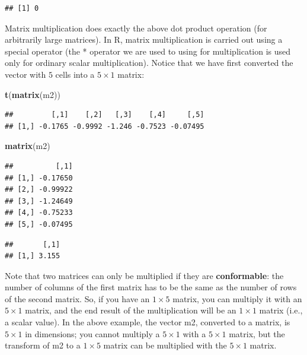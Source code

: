 \documentclass[12pt,]{krantz}
\newenvironment{Shaded}{\begin{snugshade}}{\end{snugshade}}
\newcommand{\KeywordTok}[1]{\textcolor[rgb]{0.13,0.29,0.53}{\textbf{#1}}}
\newcommand{\NormalTok}[1]{#1}
\newcommand{\OperatorTok}[1]{\textcolor[rgb]{0.81,0.36,0.00}{\textbf{#1}}}
\begin{document}
\begin{verbatim}
## [1] 0
\end{verbatim}

Matrix multiplication does exactly the above dot product operation (for arbitrarily large matrices). In R, matrix multiplication is carried out using a special operator (the * operator we are used to using for multiplication is used only for ordinary scalar multiplication). Notice that we have first converted the vector with \(5\) cells into a \(5\times 1\) matrix:

\begin{Shaded}
\begin{Highlighting}[]
\KeywordTok{t}\NormalTok{(}\KeywordTok{matrix}\NormalTok{(m2))}
\end{Highlighting}
\end{Shaded}

\begin{verbatim}
##         [,1]    [,2]   [,3]    [,4]     [,5]
## [1,] -0.1765 -0.9992 -1.246 -0.7523 -0.07495
\end{verbatim}

\begin{Shaded}
\begin{Highlighting}[]
\KeywordTok{matrix}\NormalTok{(m2)}
\end{Highlighting}
\end{Shaded}

\begin{verbatim}
##          [,1]
## [1,] -0.17650
## [2,] -0.99922
## [3,] -1.24649
## [4,] -0.75233
## [5,] -0.07495
\end{verbatim}

\begin{Shaded}
\end{Shaded}

\begin{verbatim}
##       [,1]
## [1,] 3.155
\end{verbatim}

Note that two matrices can only be multiplied if they are \textbf{conformable}: the number of columns of the first matrix has to be the same as the number of rows of the second matrix. So, if you have an \(1\times 5\) matrix, you can multiply it with an \(5\times 1\) matrix, and the end result of the multiplication will be an \(1\times 1\) matrix (i.e., a scalar value). In the above example, the vector m2, converted to a matrix, is \(5\times 1\) in dimensions; you cannot multiply a \(5\times 1\) with a \(5\times 1\) matrix, but the transform of m2 to a \(1\times 5\) matrix can be multiplied with the \(5\times 1\) matrix.
\end{document}

